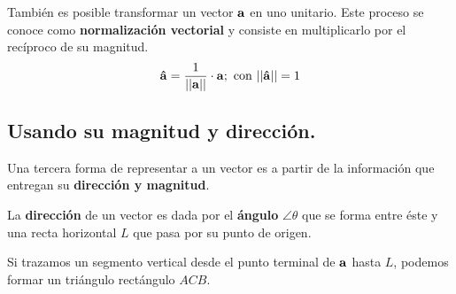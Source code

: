 \documentclass[12pt]{article}
\begin{document}
También es posible transformar un vector $\mathbf{a}$ en uno unitario. Este proceso se conoce como \textbf{normalización vectorial} y consiste en multiplicarlo por el recíproco de su magnitud.
\[
  \mathbf{\hat{a}} = \frac{1}{||\mathbf{a}||} \cdot \mathbf{a}; \text{ con } ||\mathbf{\hat{a}}|| = 1
\]

\subsection{Usando su magnitud y dirección.}

Una tercera forma de representar a un vector es a partir de la información que entregan su \textbf{dirección y magnitud}.

La \textbf{dirección} de un vector es dada por el \textbf{ángulo} $\angle \theta$ que se forma entre éste y una recta horizontal $L$ que pasa por su punto de origen.

\begin{figure}[hbt!]
\centering


\end{figure}

Si trazamos un segmento vertical desde el punto terminal de $\mathbf{a}$ hasta $L$, podemos formar un triángulo rectángulo $ACB$.

\begin{figure}[hbt!]
\centering


\end{figure}
\end{document}
